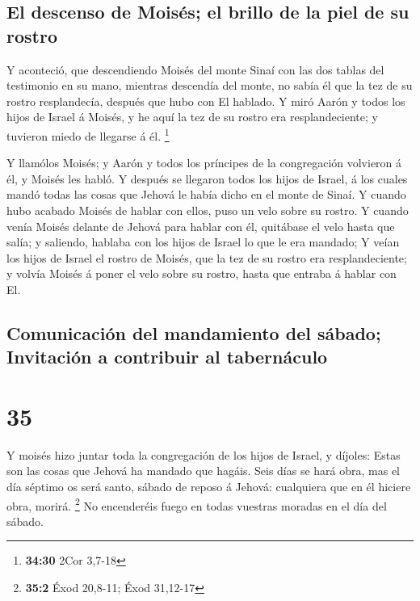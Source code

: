 \hypertarget{el-descenso-de-moisuxe9s-el-brillo-de-la-piel-de-su-rostro}{%
\subsection{El descenso de Moisés; el brillo de la piel de su
rostro}\label{el-descenso-de-moisuxe9s-el-brillo-de-la-piel-de-su-rostro}}

 Y aconteció, que descendiendo Moisés del monte Sinaí con
las dos tablas del testimonio en su mano, mientras descendía del monte,
no sabía él que la tez de su rostro resplandecía, después que hubo con
El hablado.  Y miró Aarón y todos los hijos de Israel á
Moisés, y he aquí la tez de su rostro era resplandeciente; y tuvieron
miedo de llegarse á él. \footnote{\textbf{34:30} 2Cor 3,7-18}

 Y llamólos Moisés; y Aarón y todos los príncipes de la
congregación volvieron á él, y Moisés les habló.  Y después
se llegaron todos los hijos de Israel, á los cuales mandó todas las
cosas que Jehová le había dicho en el monte de Sinaí.  Y
cuando hubo acabado Moisés de hablar con ellos, puso un velo sobre su
rostro.  Y cuando venía Moisés delante de Jehová para
hablar con él, quitábase el velo hasta que salía; y saliendo, hablaba
con los hijos de Israel lo que le era mandado;  Y veían los
hijos de Israel el rostro de Moisés, que la tez de su rostro era
resplandeciente; y volvía Moisés á poner el velo sobre su rostro, hasta
que entraba á hablar con El.

\hypertarget{comunicaciuxf3n-del-mandamiento-del-suxe1bado-invitaciuxf3n-a-contribuir-al-tabernuxe1culo}{%
\subsection{Comunicación del mandamiento del sábado; Invitación a
contribuir al
tabernáculo}\label{comunicaciuxf3n-del-mandamiento-del-suxe1bado-invitaciuxf3n-a-contribuir-al-tabernuxe1culo}}

\hypertarget{section-34}{%
\section{35}\label{section-34}}

 Y moisés hizo juntar toda la congregación de los hijos de
Israel, y díjoles: Estas son las cosas que Jehová ha mandado que hagáis.
 Seis días se hará obra, mas el día séptimo os será santo,
sábado de reposo á Jehová: cualquiera que en él hiciere obra, morirá.
\footnote{\textbf{35:2} Éxod 20,8-11; Éxod 31,12-17}  No
encenderéis fuego en todas vuestras moradas en el día del sábado.

